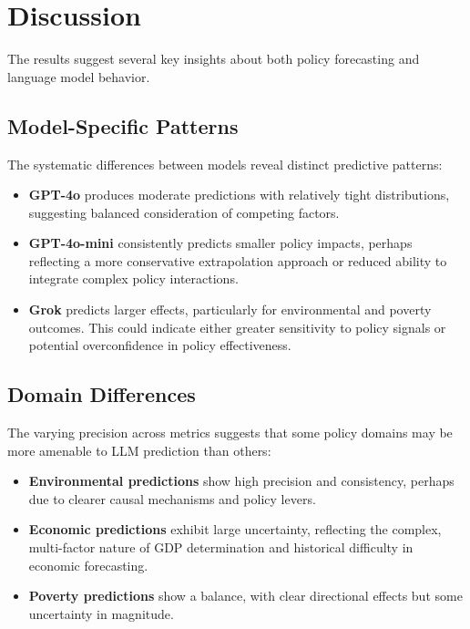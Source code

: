 \section{Discussion}\label{sec:discussion}

The results suggest several key insights about both policy forecasting and language model behavior.

\subsection{Model-Specific Patterns}

The systematic differences between models reveal distinct predictive patterns:

\begin{itemize}
    \item \textbf{GPT-4o} produces moderate predictions with relatively tight distributions, suggesting balanced consideration of competing factors.
    
    \item \textbf{GPT-4o-mini} consistently predicts smaller policy impacts, perhaps reflecting a more conservative extrapolation approach or reduced ability to integrate complex policy interactions.
    
    \item \textbf{Grok} predicts larger effects, particularly for environmental and poverty outcomes. This could indicate either greater sensitivity to policy signals or potential overconfidence in policy effectiveness.
\end{itemize}

\subsection{Domain Differences}

The varying precision across metrics suggests that some policy domains may be more amenable to LLM prediction than others:

\begin{itemize}
    \item \textbf{Environmental predictions} show high precision and consistency, perhaps due to clearer causal mechanisms and policy levers.
    
    \item \textbf{Economic predictions} exhibit large uncertainty, reflecting the complex, multi-factor nature of GDP determination and historical difficulty in economic forecasting.
    
    \item \textbf{Poverty predictions} show a balance, with clear directional effects but some uncertainty in magnitude.
\end{itemize}

